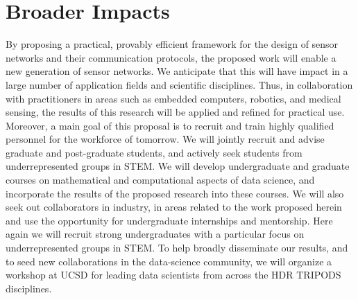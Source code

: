 \documentclass{article}
\begin{document}
\section{Broader Impacts}
By proposing a practical, provably efficient  framework for the design of sensor networks and their communication protocols, the proposed work will enable a new generation of sensor networks. We anticipate that this will have impact in a large number of application fields and scientific disciplines. Thus, in collaboration with practitioners in areas such as embedded computers, robotics, and medical sensing, the results of this research will be applied and refined for practical use. 
Moreover, a main goal of this proposal is to recruit and train highly qualified personnel for the workforce of tomorrow. We will jointly recruit and advise graduate and post-graduate students, and actively seek students from underrepresented groups in STEM. We will develop undergraduate and graduate courses on mathematical and computational aspects of data science, and incorporate the
results of the proposed research into these courses. We will also seek out collaborators in industry, in areas related to the work proposed herein and use the opportunity for undergraduate internships and mentorship. Here again we will recruit strong undergraduates with a particular focus on underrepresented groups in STEM.
To help broadly disseminate our results, and to seed new collaborations in the data-science community, we will organize a workshop at UCSD for leading data scientists from across the HDR TRIPODS disciplines. 
\end{document}
